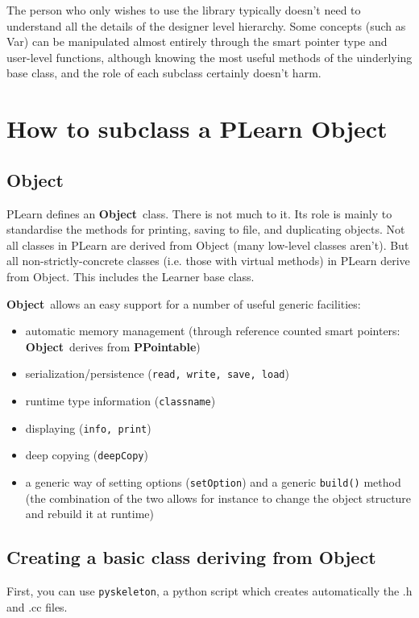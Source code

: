 \documentclass[11pt]{book}
\newcommand{\Object}{{\bf Object}}
\newcommand{\PPointable}{{\bf PPointable}}
\begin{document}
 The person who only wishes to use the library typically doesn't need to understand all the details of the designer level hierarchy. Some concepts (such as Var) can be manipulated almost entirely through the smart pointer type and user-level functions, although knowing the most useful methods of the uinderlying base class, and the role of each subclass certainly doesn't harm. 

\section{How to subclass a PLearn \Object}
\label{Object}

\subsection{\Object}

 PLearn defines an \Object\ class. There is not much to it. Its role
is mainly to standardise the methods for printing, saving to file, and
duplicating objects. Not all classes in PLearn are derived from Object
(many low-level classes aren't). But all non-strictly-concrete classes
(i.e. those with virtual methods) in PLearn derive from Object. This
includes the Learner base class.

\Object\ allows an easy support for a number of useful generic facilities:
\begin{itemize}
\item automatic memory management (through reference counted smart pointers: \Object\ derives from \PPointable)
\item serialization/persistence ({\tt read, write, save, load})
\item runtime type information ({\tt classname})
\item displaying ({\tt info, print})
\item deep copying ({\tt deepCopy})
\item a generic way of setting options ({\tt setOption}) and a generic
  {\tt build()} method (the combination of the two allows for instance
  to change the object structure and rebuild it at runtime)
\end{itemize}


\subsection{Creating a basic class deriving from Object}

First, you can use \texttt{pyskeleton}, a python script which creates automatically the .h and .cc files.
\end{document}

